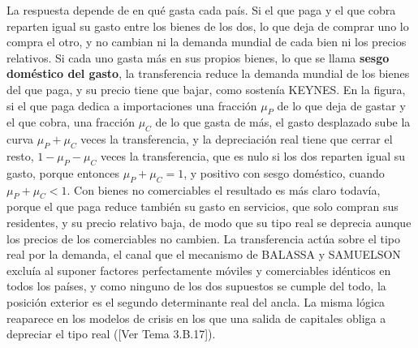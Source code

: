 \documentclass[10pt,a4paper]{article}
\newcommand{\authorfont}[1]{{\fontfamily{EBGaramond-TLF}\selectfont #1}}
\begin{document}
La respuesta depende de en qué gasta cada país. Si el que paga y el que cobra reparten igual su gasto entre los bienes de los dos, lo que deja de comprar uno lo compra el otro, y no cambian ni la demanda mundial de cada bien ni los precios relativos. Si cada uno gasta más en sus propios bienes, lo que se llama \textbf{sesgo doméstico del gasto}, la transferencia reduce la demanda mundial de los bienes del que paga, y su precio tiene que bajar, como sostenía KEYNES. En la figura, si el que paga dedica a importaciones una fracción $\mu_P$ de lo que deja de gastar y el que cobra, una fracción $\mu_C$ de lo que gasta de más, el gasto desplazado sube la curva $\mu_P+\mu_C$ veces la transferencia, y la depreciación real tiene que cerrar el resto, $1-\mu_P-\mu_C$ veces la transferencia, que es nulo si los dos reparten igual su gasto, porque entonces $\mu_P+\mu_C=1$, y positivo con sesgo doméstico, cuando $\mu_P+\mu_C<1$. Con bienes no comerciables el resultado es más claro todavía, porque el que paga reduce también su gasto en servicios, que solo compran sus residentes, y su precio relativo baja, de modo que su tipo real se deprecia aunque los precios de los comerciables no cambien. La transferencia actúa sobre el tipo real por la demanda, el canal que el mecanismo de BALASSA y SAMUELSON excluía al suponer factores perfectamente móviles y comerciables idénticos en todos los países, y como ninguno de los dos supuestos se cumple del todo, la posición exterior es el segundo determinante real del ancla. La misma lógica reaparece en los modelos de crisis en los que una salida de capitales obliga a depreciar el tipo real ([\authorfont{Ver Tema 3.B.17}]).
\end{document}
